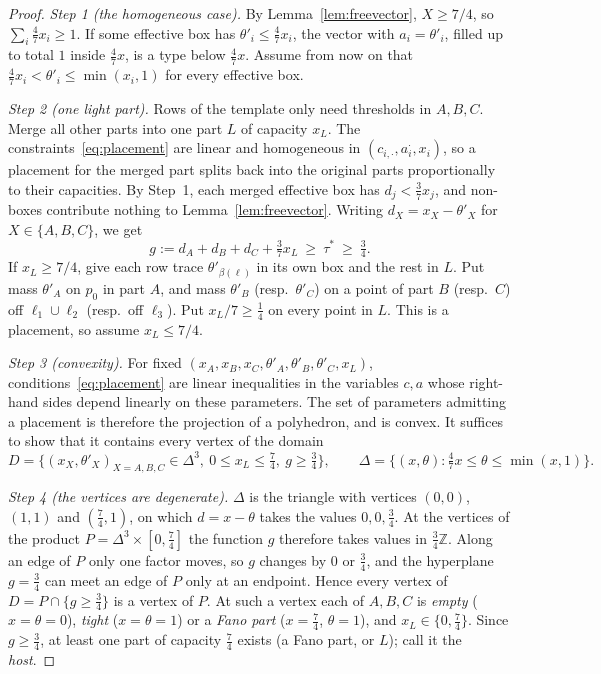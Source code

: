 \documentclass[11pt]{amsart}
\theoremstyle{definition}
\theoremstyle{remark}
\begin{document}
\begin{proof}
\emph{Step 1 (the homogeneous case).} By Lemma~\ref{lem:freevector}, $X\ge7/4$, so $\sum_i\frac47x_i\ge1$. If some effective box has $\theta'_i\le\frac47x_i$, the vector with $a_i=\theta'_i$, filled up to total $1$ inside $\frac47x$, is a type below $\frac47x$. Assume from now on that $\frac47x_i<\theta'_i\le\min(x_i,1)$ for every effective box.

\emph{Step 2 (one light part).} Rows of the template only need thresholds in $A,B,C$. Merge all other parts into one part $L$ of capacity $x_L$. The constraints~\eqref{eq:placement} are linear and homogeneous in $(c_{i,\cdot},a_{i}^{\cdot},x_i)$, so a placement for the merged part splits back into the original parts proportionally to their capacities. By Step~1, each merged effective box has $d_j<\frac37x_j$, and non-boxes contribute nothing to Lemma~\ref{lem:freevector}. Writing $d_X=x_X-\theta'_X$ for $X\in\{A,B,C\}$, we get
\begin{equation}\label{eq:g}
g:=d_A+d_B+d_C+\tfrac37x_L\ \ge\ \tau^*\ \ge\ \tfrac34 .
\end{equation}
If $x_L\ge7/4$, give each row trace $\theta'_{\beta(\ell)}$ in its own box and the rest in $L$. Put mass $\theta'_A$ on $p_0$ in part $A$, and mass $\theta'_B$ (resp.\ $\theta'_C$) on a point of part $B$ (resp.\ $C$) off $\ell_1\cup\ell_2$ (resp.\ off $\ell_3$). Put $x_L/7\ge\frac14$ on every point in $L$. This is a placement, so assume $x_L\le7/4$.

\emph{Step 3 (convexity).} For fixed $(x_A,x_B,x_C,\theta'_A,\theta'_B,\theta'_C,x_L)$, conditions~\eqref{eq:placement} are linear inequalities in the variables $c,a$ whose right-hand sides depend linearly on these parameters. The set of parameters admitting a placement is therefore the projection of a polyhedron, and is convex. It suffices to show that it contains every vertex of the domain
\[
D=\{(x_X,\theta'_X)_{X=A,B,C}\in\Delta^3,\ 0\le x_L\le\tfrac74,\ g\ge\tfrac34\},\qquad
\Delta=\{(x,\theta):\tfrac47x\le\theta\le\min(x,1)\}.
\]

\emph{Step 4 (the vertices are degenerate).} $\Delta$ is the triangle with vertices $(0,0)$, $(1,1)$ and $(\frac74,1)$, on which $d=x-\theta$ takes the values $0,0,\frac34$. At the vertices of the product $P=\Delta^3\times[0,\frac74]$ the function $g$ therefore takes values in $\frac34\mathbb Z$. Along an edge of $P$ only one factor moves, so $g$ changes by $0$ or $\frac34$, and the hyperplane $g=\frac34$ can meet an edge of $P$ only at an endpoint. Hence every vertex of $D=P\cap\{g\ge\frac34\}$ is a vertex of $P$. At such a vertex each of $A,B,C$ is \emph{empty} ($x=\theta=0$), \emph{tight} ($x=\theta=1$) or a \emph{Fano part} ($x=\frac74$, $\theta=1$), and $x_L\in\{0,\frac74\}$. Since $g\ge\frac34$, at least one part of capacity $\frac74$ exists (a Fano part, or $L$); call it the \emph{host}.


\end{proof}
\end{document}
